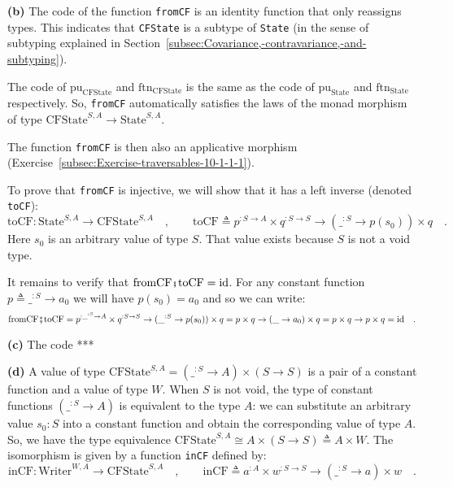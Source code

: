 \textbf{(b)} The code of the function \lstinline!fromCF! is an identity
function that only reassigns types. This indicates that \lstinline!CFState!
is a subtype of \lstinline!State! (in the sense of subtyping explained
in Section~\ref{subsec:Covariance,-contravariance,-and-subtyping}).

The code of $\text{pu}_{\text{CFState}}$ and $\text{ftn}_{\text{CFState}}$
is the same as the code of $\text{pu}_{\text{State}}$ and $\text{ftn}_{\text{State}}$
respectively. So, \lstinline!fromCF! automatically satisfies the
laws of the monad morphism of type $\text{CFState}^{S,A}\rightarrow\text{State}^{S,A}$. 

The function \lstinline!fromCF! is then also an applicative morphism
(Exercise~\ref{subsec:Exercise-traversables-10-1-1-1}).

To prove that \lstinline!fromCF! is injective, we will show that
it has a left inverse (denoted \lstinline!toCF!):
\[
\text{toCF}:\text{State}^{S,A}\rightarrow\text{CFState}^{S,A}\quad,\quad\quad\text{toCF}\triangleq p^{:S\rightarrow A}\times q^{:S\rightarrow S}\rightarrow(\_^{:S}\rightarrow p(s_{0}))\times q\quad.
\]
Here $s_{0}$ is an arbitrary value of type $S$. That value exists
because $S$ is not a void type.

It remains to verify that $\text{fromCF}\bef\text{toCF}=\text{id}$.
For any constant function $p\triangleq\_^{:S}\rightarrow a_{0}$ we
will have $p(s_{0})=a_{0}$ and so we can write:
\[
\text{fromCF}\bef\text{toCF}=p^{:\_^{:S}\rightarrow A}\times q^{:S\rightarrow S}\rightarrow(\_^{:S}\rightarrow p(s_{0}))\times q=p\times q\rightarrow(\_\rightarrow a_{0})\times q=p\times q\rightarrow p\times q=\text{id}\quad.
\]

\textbf{(c)} The code {*}{*}{*}

\textbf{(d)} A value of type $\text{CFState}^{S,A}=(\_^{:S}\rightarrow A)\times(S\rightarrow S)$
is a pair of a constant function and a value of type $W$. When $S$
is not void, the type of constant functions $(\_^{:S}\rightarrow A)$
is equivalent to the type $A$: we can substitute an arbitrary value
$s_{0}:S$ into a constant function and obtain the corresponding value
of type $A$. So, we have the type equivalence $\text{CFState}^{S,A}\cong A\times(S\rightarrow S)\triangleq A\times W$.
The isomorphism is given by a function \lstinline!inCF! defined by:
\[
\text{inCF}:\text{Writer}^{W,A}\rightarrow\text{CFState}^{S,A}\quad,\quad\quad\text{inCF}\triangleq a^{:A}\times w^{:S\rightarrow S}\rightarrow(\_^{:S}\rightarrow a)\times w\quad.
\]


